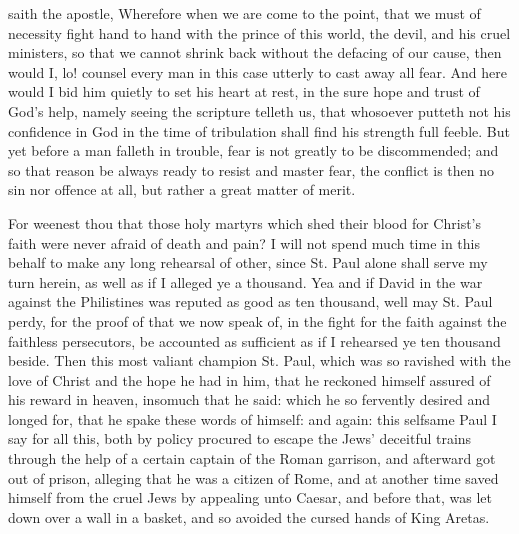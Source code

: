 \documentclass[a5paper]{scrbook}
\begin{document}
	 saith the apostle,  Wherefore when we are come to the point, that we must of necessity fight hand to hand with the prince of this world, the devil, and his cruel ministers, so that we cannot shrink back without the defacing of our cause, then would I, lo! counsel every man in this case utterly to cast away all fear. And here would I bid him quietly to set his heart at rest, in the sure hope and trust of God's help, namely seeing the scripture telleth us, that whosoever putteth not his confidence in God in the time of tribulation shall find his strength full feeble. But yet before a man falleth in trouble, fear is not greatly to be discommended; and so that reason be always ready to resist and master fear, the conflict is then no sin nor offence at all, but rather a great matter of merit.
	
	For weenest thou that those holy martyrs which shed their blood for Christ's faith were never afraid of death and pain? I will not spend much time in this behalf to make any long rehearsal of other, since St. Paul alone shall serve my turn herein, as well as if I alleged ye a thousand. Yea and if David in the war against the Philistines was reputed as good as ten thousand, well may St. Paul perdy, for the proof of that we now speak of, in the fight for the faith against the faithless persecutors, be accounted as sufficient as if I rehearsed ye ten thousand beside. Then this most valiant champion St. Paul, which was so ravished with the love of Christ and the hope he had in him, that he reckoned himself assured of his reward in heaven, insomuch that he said:  which he so fervently desired and longed for, that he spake these words of himself:  and again:  this selfsame Paul I say for all this, both by policy procured to escape the Jews' deceitful trains through the help of a certain captain of the Roman garrison, and afterward got out of prison, alleging that he was a citizen of Rome, and at another time saved himself from the cruel Jews by appealing unto Caesar, and before that, was let down over a wall in a basket, and so avoided the cursed hands of King Aretas.
	
\end{document}
